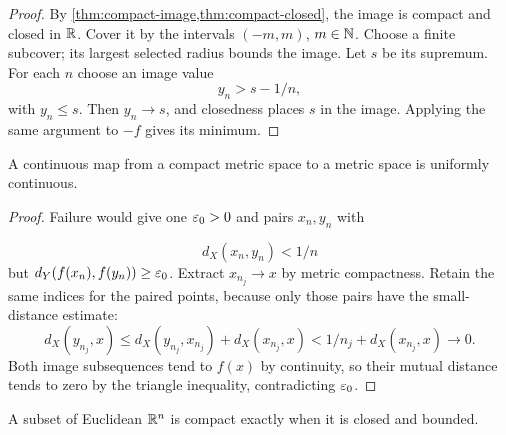 \begin{proof}
By \cref{thm:compact-image,thm:compact-closed}, the image is compact and
closed in $\mathbb{R}$. Cover it by the intervals $(-m,m)$, $m\in\mathbb{N}$.
Choose a finite subcover; its largest selected radius bounds the image. Let $s$ be its
supremum. For each $n$ choose an image value
\[
y_n>s-1/n,
\]
 with $y_n\leq s$.
Then $y_n\to s$, and closedness places $s$ in the image. Applying the
same argument to $-f$ gives its minimum.
\end{proof}
\begin{theorem}\label{thm:compact-uniform-continuity}
A continuous map from a compact metric space to a metric space is uniformly
continuous.
\end{theorem}
\begin{proof}
Failure would give one $\varepsilon_0>0$ and pairs $x_n,y_n$ with

\[
d_X(x_n,y_n)<1/n
\]
 but $d_Y(f(x_n),f(y_n))\geq\varepsilon_0$.
Extract $x_{n_j}\to x$ by metric compactness. Retain the same indices for
the paired points, because only those pairs have the small-distance estimate:
\[
d_X(y_{n_j},x)\leq d_X(y_{n_j},x_{n_j})+d_X(x_{n_j},x)
<1/n_j+d_X(x_{n_j},x)\longrightarrow0.
\]
Both image subsequences tend to $f(x)$ by continuity, so their mutual
distance tends to zero by the triangle inequality, contradicting $\varepsilon_0$.
\end{proof}
\begin{theorem}\label{thm:heine-borel-rn}
A subset of Euclidean $\mathbb{R}^n$ is compact exactly when it is closed and bounded.
\end{theorem}
